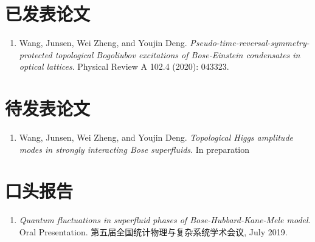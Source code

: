 
\begin{publications}

\section*{已发表论文}

\begin{enumerate}
\item Wang, Junsen, Wei Zheng, and Youjin Deng. \emph{Pseudo-time-reversal-symmetry-protected topological Bogoliubov excitations of Bose-Einstein condensates in optical lattices}. Physical Review A 102.4 (2020): 043323.
\end{enumerate}

\section*{待发表论文}

\begin{enumerate}
\item Wang, Junsen, Wei Zheng, and Youjin Deng. \emph{Topological Higgs amplitude modes in strongly interacting Bose superfluids}. In preparation
\end{enumerate}

\section*{口头报告}
\begin{enumerate}
\item \emph{Quantum fluctuations in superfluid phases of Bose-Hubbard-Kane-Mele model}. Oral Presentation. 第五届全国统计物理与复杂系统学术会议, July 2019.
\end{enumerate}

\end{publications}
